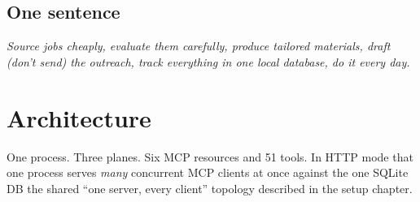 \documentclass[11pt,letterpaper]{article}
\begin{document}
\subsection*{One sentence}

\textit{Source jobs cheaply, evaluate them carefully, produce tailored materials, draft (don't send) the outreach, track everything in one local database, do it every day.}

\section{Architecture}

One process. Three planes. Six MCP resources and 51 tools. In HTTP mode that one process serves \emph{many} concurrent MCP clients at once against the one SQLite DB \textemdash{} the shared ``one server, every client'' topology described in the setup chapter.
\end{document}
